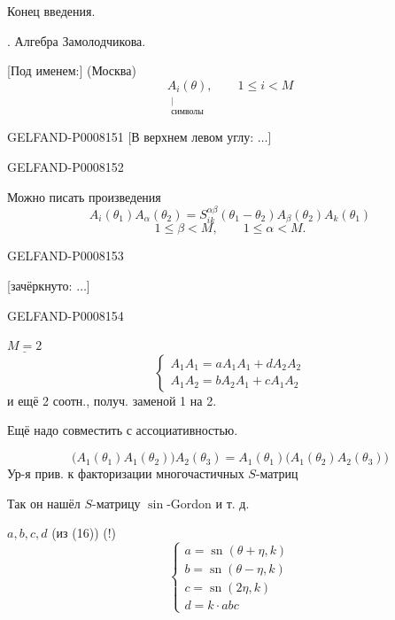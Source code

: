 Конец введения.

. Алгебра Замолодчикова.

[Под именем:] (Москва)
\[
\underset{\substack{\vert\\\text{символы}}}{A_i(\theta)},\qquad 1\le i<M
\]


\begin{GelfandAdjacentEvidence}{GELFAND-P000815}{1}
[В верхнем левом углу: \(\ldots\)]
\end{GelfandAdjacentEvidence}
\begin{GelfandAdjacentEvidence}{GELFAND-P000815}{2}


Можно писать произведения
\begin{equation*}
A_i(\theta_1)A_\alpha(\theta_2)
=S_{ik}^{\alpha\beta}(\theta_1-\theta_2)A_\beta(\theta_2)A_k(\theta_1)\tag{15}
\end{equation*}
\[
1\le\beta<M,\qquad 1\le\alpha<M.
\]
\end{GelfandAdjacentEvidence}
\begin{GelfandAdjacentEvidence}{GELFAND-P000815}{3}


[зачёркнуто: \(\ldots\)]
\end{GelfandAdjacentEvidence}
\begin{GelfandAdjacentEvidence}{GELFAND-P000815}{4}

\(\underline{M=2}\)
\begin{equation*}
\begin{cases}
A_1A_1=aA_1A_1+dA_2A_2\\
A_1A_2=bA_2A_1+cA_1A_2
\end{cases}\tag{16}
\end{equation*}
и ещё 2 соотн., получ. заменой 1 на 2.

Ещё надо совместить с ассоциативностью.

\[
\bigl(A_1(\theta_1)A_1(\theta_2)\bigr)A_2(\theta_3)
=A_1(\theta_1)\bigl(A_1(\theta_2)A_2(\theta_3)\bigr)
\]
Ур-я прив. к факторизации многочастичных \(S\)-матриц

Так он нашёл \(S\)-матрицу \(\sin\)-Gordon и т. д.

 \(a,b,c,d\) (из (16))  (!)
\begin{equation*}
\begin{cases}
a=\operatorname{sn}(\theta+\eta,k)\\
b=\operatorname{sn}(\theta-\eta,k)\\
c=\operatorname{sn}(2\eta,k)\\
d=k\cdot abc
\end{cases}\tag{17}
\end{equation*}
\end{GelfandAdjacentEvidence}
